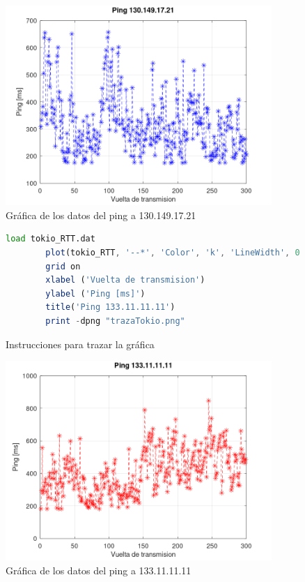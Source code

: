 \begin{figure}[H]
	\centering
	\includegraphics[width=0.90\textwidth]{img/trazaAlemania.png}
	\caption{Gr\'afica de los datos del ping a 130.149.17.21}
	\label{fig:alemaniaGraph}
\end{figure}

\newpage

\begin{figure}[H] 
    \centering 
    \begin{lstlisting}[frame=single, breaklines=true, basicstyle=\footnotesize\ttfamily, breakatwhitespace=false, columns=flexible, tabsize=2, showstringspaces=false, language=Octave] 
        load tokio_RTT.dat 
        plot(tokio_RTT, '--*', 'Color', 'k', 'LineWidth', 0.5, 'MarkerSize', 8) 
        grid on 
        xlabel ('Vuelta de transmision') 
        ylabel ('Ping [ms]') 
        title('Ping 133.11.11.11') 
        print -dpng "trazaTokio.png" 
    \end{lstlisting} 
    \caption{Instrucciones para trazar la gr\'afica} 
    \label{fig:tokioOctave} 
\end{figure}

\begin{figure}[H]
	\centering
	\includegraphics[width=0.90\textwidth]{img/trazaTokio.png}
	\caption{Gr\'afica de los datos del ping a 133.11.11.11}
	\label{fig:tokioGraph}
\end{figure}

